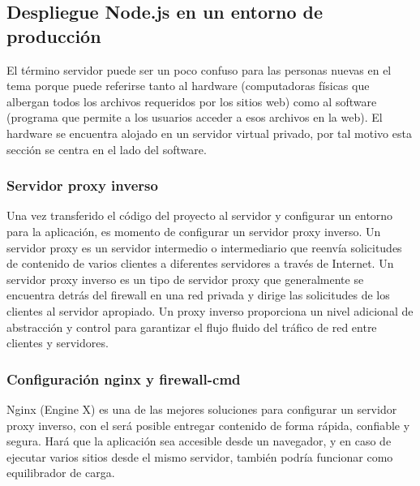 \subsection{Despliegue Node.js en un entorno de producción}
El término servidor puede ser un poco confuso para las personas nuevas en el tema porque puede referirse tanto al \gls{hardware} (computadoras físicas que albergan todos los archivos requeridos por los sitios web) como al \gls{software} (programa que permite a los usuarios acceder a esos archivos en la web). El \gls{hardware} se encuentra alojado en un servidor virtual privado, por tal motivo esta sección se centra en el lado del software.

\subsubsection{Servidor proxy inverso}
Una vez transferido el código del proyecto al servidor y configurar un entorno para la aplicación, es momento de configurar un servidor proxy inverso. Un servidor proxy es un servidor intermedio o intermediario que reenvía solicitudes de contenido de varios clientes a diferentes servidores a través de Internet. Un servidor proxy inverso es un tipo de servidor proxy que generalmente se encuentra detrás del firewall en una red privada y dirige las solicitudes de los clientes al servidor apropiado. Un proxy inverso proporciona un nivel adicional de abstracción y control para garantizar el flujo fluido del tráfico de red entre clientes y servidores.

\subsubsection{Configuración nginx y firewall-cmd}
Nginx (Engine X) es una de las mejores soluciones para configurar un servidor proxy inverso, con el será posible entregar contenido de forma rápida, confiable y segura. Hará que la aplicación sea accesible desde un navegador, y en caso de ejecutar varios sitios desde el mismo servidor, también podría funcionar como equilibrador de carga.
\vspace{0.8cm}

